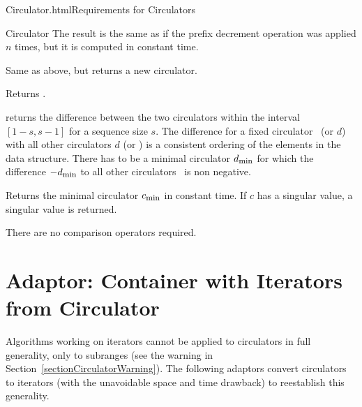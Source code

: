 \begin{ccHtmlClassFile}{Circulator.html}{Requirements for Circulators}
\begin{ccClass}{Circulator}
{The result is the same as if the prefix decrement operation 
 was applied $n$ times, but it is computed in constant time.}

{Same as above, but returns a new circulator.}


{Returns .}

{returns the difference between the two circulators within the
  interval $\left[ 1-s , s-1 \right]$ for a sequence size $s$. The
  difference for a fixed circulator \ccVar\ (or $d$) with all other
  circulators $d$ (or \ccVar) is a consistent ordering of the elements
  in the data structure. There has to be a minimal circulator
  $d_{\mbox{\footnotesize min}}$ for which the difference \ccVar $-
  d_{\mbox{\footnotesize min}}$ to all other circulators \ccVar\ is
  non negative.}

{Returns the minimal circulator $c_{\mbox{\footnotesize min}}$ in
  constant time. If $c$ has a singular value, a singular value is
  returned.} 

There are no comparison operators required.
\end{ccClass} 
\end{ccHtmlClassFile} 

\newpage
\section{Adaptor: Container with Iterators from Circulator}
\label{sectionContainerFromCirc}

Algorithms working on iterators cannot be applied to circulators in
full generality, only to subranges (see the warning in
Section~\ref{sectionCirculatorWarning}). The following adaptors
convert circulators to iterators (with the unavoidable space and time
drawback) to reestablish this generality.

